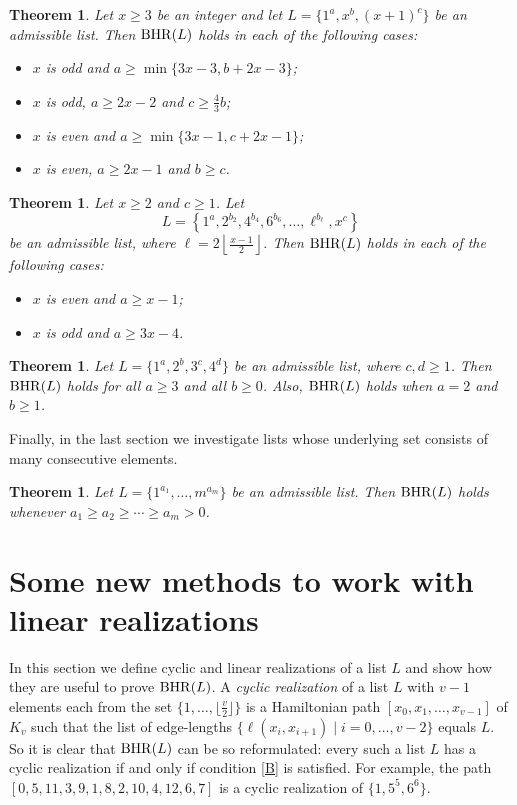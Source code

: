 \documentclass{amsart}
\newtheorem{thm}[prop]{Theorem}
\theoremstyle{definition}
\numberwithin{equation}{section}
\def\BHR{\mathop{\rm BHR}}
\begin{document}
\begin{thm}\label{main}
Let $x\geq 3$ be an integer and let $L=\{1^a,x^b,(x+1)^c\}$ be an admissible list.
Then $\BHR(L)$ holds in each of the following cases:
\begin{itemize}
\item[(1)] $x$ is odd and $a\geq \min\{3x-3, b+2x-3 \}$;
\item[(2)] $x$ is odd, $a\geq 2x-2$ and $c\geq \frac{4}{3} b$;
\item[(3)] $x$ is even and $a\geq \min\{3x-1, c+2x-1\}$;
\item[(4)] $x$ is even, $a\geq 2x-1$ and $b\geq c$.
\end{itemize}
\end{thm}

\begin{thm}\label{pari}
Let $x\geq 2$ and  $c\geq 1$. Let
$$L=\left\{1^{a}, 2^{b_2}, 4^{b_4}, 6^{b_6},\ldots, \ell^{b_\ell},  x^c \right\}$$
be an admissible list, where $\ell=2\left\lfloor\frac{x-1}{2}\right\rfloor$.
Then $\BHR(L)$ holds in each of the following cases:
\begin{itemize}
 \item[(1)] $x$ is even and $a\geq x-1$;
 \item[(2)] $x$ is odd and $a\geq 3x-4$.
\end{itemize}
\end{thm}

\begin{thm}\label{th1234}
Let $L=\{1^a, 2^b, 3^c, 4^d\}$ be an admissible list, where $c,d\geq 1$.
Then $\BHR(L)$ holds for all $a\geq 3$ and all $b\geq 0$. Also,  $\BHR(L)$ holds when $a=2$ and $b\geq 1$.
\end{thm}

Finally, in the last section we investigate lists whose underlying set consists of many consecutive elements.

\begin{thm}\label{66}
Let $L = \{ 1^{a_1}, \ldots, m^{a_m} \}$ be an admissible list.
Then $\BHR(L)$ holds whenever
$a_1 \geq a_2 \geq \cdots \geq a_m > 0$.
\end{thm}




\section{Some new methods to  work with linear realizations}\label{sec:realization}

In this section we define cyclic and linear realizations of a list $L$ and
show how they are useful to prove $\BHR(L)$.
A \emph{cyclic realization} of a list $L$ with $v-1$ elements each
from the set
$\{1,\ldots,\lfloor\frac{v}{2}\rfloor\}$ is a Hamiltonian path $[x_0,x_1,\ldots,x_{v-1}]$
of $K_{v}$ such that the list of edge-lengths
$\{\ell(x_i,x_{i+1})\mid i=0,\ldots,v-2\}$ equals $L$. So it is clear that
$\BHR(L)$ can be so reformulated:
 every such a list $L$ has a cyclic realization
if and only if condition \eqref{B} is satisfied.
For example, the path $[0,5,11,3,9,1,8,2,10,4,12,6,7]$ is a cyclic realization of $\{1,5^5,6^6\}$.
\end{document}
